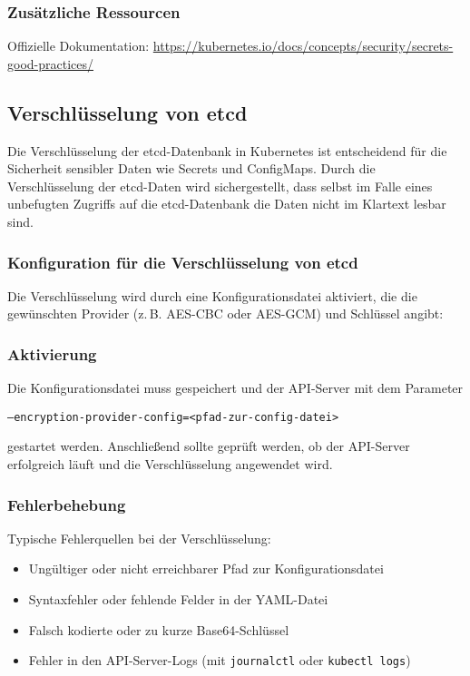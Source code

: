 \subsubsection{Zusätzliche Ressourcen}
Offizielle Dokumentation: \url{https://kubernetes.io/docs/concepts/security/secrets-good-practices/}

\newpage
\subsection{Verschlüsselung von etcd}
Die Verschlüsselung der etcd-Datenbank in Kubernetes ist entscheidend für die Sicherheit sensibler Daten wie Secrets und ConfigMaps. Durch die Verschlüsselung der etcd-Daten wird sichergestellt, dass selbst im Falle eines unbefugten Zugriffs auf die etcd-Datenbank die Daten nicht im Klartext lesbar sind.
\subsubsection{Konfiguration für die Verschlüsselung von etcd}
Die Verschlüsselung wird durch eine Konfigurationsdatei aktiviert, die die gewünschten Provider (z.\,B. AES-CBC oder AES-GCM) und Schlüssel angibt:


\noindent
\subsubsection{Aktivierung}

Die Konfigurationsdatei muss gespeichert und der API-Server mit dem Parameter

\texttt{--encryption-provider-config=<pfad-zur-config-datei>}  

\noindent
gestartet werden. Anschließend sollte geprüft werden, ob der API-Server erfolgreich läuft und die Verschlüsselung angewendet wird.

\subsubsection{Fehlerbehebung}
Typische Fehlerquellen bei der Verschlüsselung:

\begin{itemize}
    \item Ungültiger oder nicht erreichbarer Pfad zur Konfigurationsdatei
    \item Syntaxfehler oder fehlende Felder in der YAML-Datei
    \item Falsch kodierte oder zu kurze Base64-Schlüssel
    \item Fehler in den API-Server-Logs (mit \texttt{journalctl} oder \texttt{kubectl logs})
\end{itemize}

